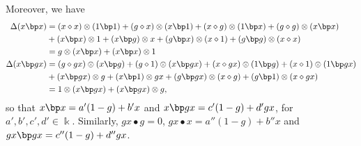 \documentclass[10pt]{article}
\theoremstyle{definition}
\renewcommand{\wp}{\diamond}
\newcommand{\ot}{\otimes}
\begin{document}
Moreover, we have
\begin{align*}
    \Delta(x\bp x)&=(x\wp x)\ot(1\bp 1)+(g\wp x)\ot(x\bp 1)+(x\wp g)\ot(1\bp x)+(g\wp g)\ot(x\bp x)\\&+(x\bp x)\ot 1+(x\bp g)\ot x+(g\bp x)\ot(x\wp 1)+(g\bp g)\ot(x\wp x)\\&=g\ot(x\bp x)+(x\bp x)\ot 1\\\Delta(x\bp gx)&=(g\wp gx)\ot(x\bp g)+(g\wp 1)\ot(x\bp gx)+(x\wp gx)\ot(1\bp g)+(x\wp 1)\ot(1\bp gx)\\&+(x\bp gx)\ot g+(x\bp 1)\ot gx+(g\bp gx)\ot(x\wp g)+(g\bp 1)\ot(x\wp gx)\\&=1\ot(x\bp gx)+(x\bp gx)\ot g,
\end{align*}
so that $x\bp x=a'(1-g)+b'x$ and $x\bp gx=c'(1-g)+d'gx$, for $a',b',c',d'\in\Bbbk$. Similarly, $gx\bullet g=0$, $gx\bullet x=a''(1-g)+b''x$ and $gx\bp gx=c''(1-g)+d''gx$.
\end{document}
